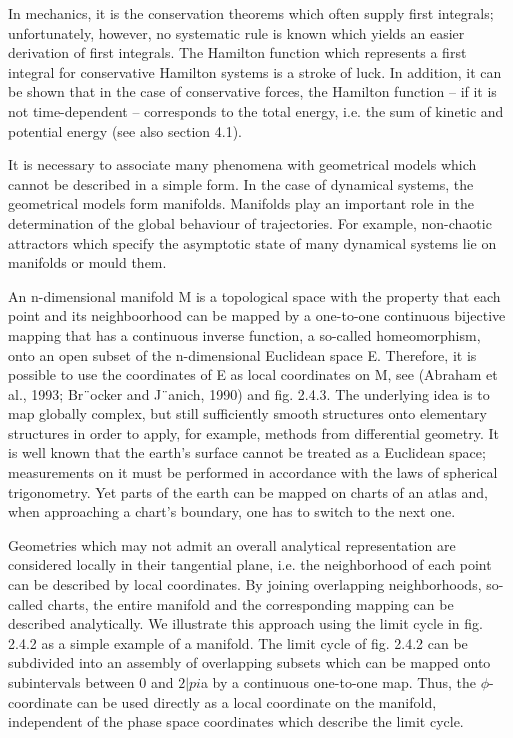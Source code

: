 \documentclass[12pt]{article}
\begin{document}
\hfill

In mechanics, it is the conservation theorems which often supply first integrals; unfortunately,
however, no systematic rule is known which yields an easier derivation
of first integrals. The Hamilton function which represents a first integral for conservative
Hamilton systems is a stroke of luck. In addition, it can be shown that in
the case of conservative forces, the Hamilton function – if it is not time-dependent
– corresponds to the total energy, i.e. the sum of kinetic and potential energy (see
also section 4.1).

\hfill

It is necessary to associate many phenomena with geometrical models which cannot
be described in a simple form. In the case of dynamical systems, the geometrical
models form manifolds. Manifolds play an important role in the determination of
the global behaviour of trajectories. For example, non-chaotic attractors which specify
the asymptotic state of many dynamical systems lie on manifolds or mould them.

\hfill

An n-dimensional manifold M is a topological space with the property that each
point and its neighboorhood can be mapped by a one-to-one continuous bijective
mapping that has a continuous inverse function, a so-called homeomorphism, onto
an open subset of the n-dimensional Euclidean space E. Therefore, it is possible
to use the coordinates of E as local coordinates on M, see (Abraham et al., 1993;
Br¨ocker and J¨anich, 1990) and fig. 2.4.3. The underlying idea is to map globally
complex, but still sufficiently smooth structures onto elementary structures in order
to apply, for example, methods from differential geometry. It is well known
that the earth’s surface cannot be treated as a Euclidean space; measurements on
it must be performed in accordance with the laws of spherical trigonometry. Yet
parts of the earth can be mapped on charts of an atlas and, when approaching a
chart’s boundary, one has to switch to the next one.

\hfill

Geometries which may not admit an overall analytical representation are considered
locally in their tangential plane, i.e. the neighborhood of each point can be
described by local coordinates. By joining overlapping neighborhoods, so-called
charts, the entire manifold and the corresponding mapping can be described analytically.
We illustrate this approach using the limit cycle in fig. 2.4.2 as a simple
example of a manifold. The limit cycle of fig. 2.4.2 can be subdivided into an assembly
of overlapping subsets which can be mapped onto subintervals between 0 and $2|pi$a by a continuous one-to-one map. Thus, the 
$\phi$-coordinate can be used directly as a local coordinate on the manifold, independent of the phase space coordinates
which describe the limit cycle.
\end{document}
